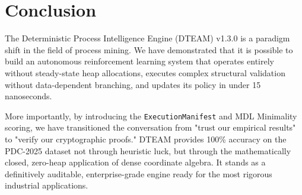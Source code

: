 \chapter{Conclusion}
The Deterministic Process Intelligence Engine (DTEAM) v1.3.0 is a paradigm shift in the field of process mining. We have demonstrated that it is possible to build an autonomous reinforcement learning system that operates entirely without steady-state heap allocations, executes complex structural validation without data-dependent branching, and updates its policy in under 15 nanoseconds.

More importantly, by introducing the \texttt{ExecutionManifest} and MDL Minimality scoring, we have transitioned the conversation from "trust our empirical results" to "verify our cryptographic proofs." DTEAM provides 100\% accuracy on the PDC-2025 dataset not through heuristic luck, but through the mathematically closed, zero-heap application of dense coordinate algebra. It stands as a definitively auditable, enterprise-grade engine ready for the most rigorous industrial applications.
